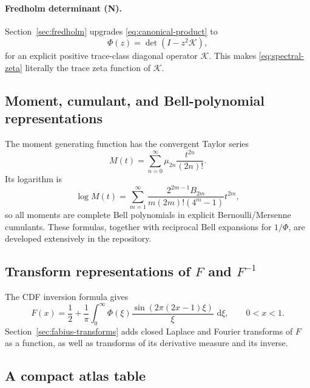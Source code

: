 \documentclass[11pt]{article}
\theoremstyle{definition}
\theoremstyle{remark}
\newcommand{\dd}{\,\mathrm d}
\newcommand{\cK}{\mathcal K}
\newcommand{\statusnew}{\textsf{N}}
\begin{document}
\paragraph{Fredholm determinant (\statusnew).}
Section~\ref{sec:fredholm} upgrades \eqref{eq:canonical-product} to
\begin{equation}
 \Phi(z)=\det(I-z^2\cK),                                    \label{eq:fredholm-preview}
\end{equation}
for an explicit positive trace-class diagonal operator \(\cK\).  This makes
\eqref{eq:spectral-zeta} literally the trace zeta function of \(\cK\).

\subsection{Moment, cumulant, and Bell-polynomial representations}

The moment generating function has the convergent Taylor series
\begin{equation}
 M(t)=\sum_{n=0}^{\infty}\mu_{2n}\frac{t^{2n}}{(2n)!}.       \label{eq:M-moment-series}
\end{equation}
Its logarithm is
\begin{equation}
 \log M(t)=
 \sum_{m=1}^{\infty}
 \frac{2^{2m-1}B_{2m}}{m(2m)!(4^m-1)}t^{2m},                \label{eq:M-cumulant}
\end{equation}
so all moments are complete Bell polynomials in explicit Bernoulli/Mersenne cumulants.
These formulas, together with reciprocal Bell expansions for \(1/\Phi\), are developed
extensively in the repository.

\subsection{Transform representations of \(F\) and \(F^{-1}\)}

The CDF inversion formula gives
\begin{equation}
 F(x)=\frac12+\frac1\pi\int_0^{\infty}
 \Phi(\xi)\frac{\sin(2\pi(2x-1)\xi)}{\xi}\,\dd\xi,
 \qquad 0<x<1.                                               \label{eq:F-CDF-Fourier}
\end{equation}
Section~\ref{sec:fabius-transforms} adds closed Laplace and Fourier transforms of \(F\) as
a function, as well as transforms of its derivative measure and its inverse.

\subsection{A compact atlas table}
\end{document}
